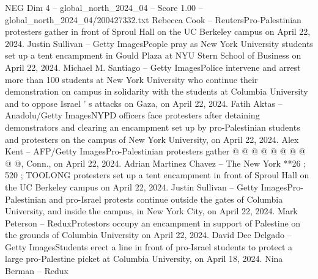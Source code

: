 \begin{textsample}{NEG Dim 4 – global\_north\_2024\_04 – Score 1.00 – global\_north\_2024\_04/200427332.txt}
Rebecca Cook -- ReutersPro-Palestinian protesters gather in front of Sproul Hall on the UC Berkeley campus on April 22, 2024.
Justin Sullivan -- Getty ImagesPeople pray as New York University students set up a tent encampment in Gould Plaza at NYU Stern School of Business on April 22, 2024.
Michael M.
Santiago -- Getty ImagesPolice intervene and arrest more than 100 students at New York University who continue their demonstration on campus in solidarity with the students at Columbia University and to oppose Israel ' s attacks on Gaza, on April 22, 2024.
Fatih Aktas -- Anadolu/Getty ImagesNYPD officers face protesters after detaining demonstrators and clearing an encampment set up by pro-Palestinian students and protesters on the campus of New York University, on April 22, 2024.
Alex Kent -- AFP/Getty ImagesPro-Palestinian protesters gather @ @ @ @ @ @ @ @ @ @, Conn., on April 22, 2024.
Adrian Martinez Chavez -- The New York **26 ; 520 ; TOOLONG protesters set up a tent encampment in front of Sproul Hall on the UC Berkeley campus on April 22, 2024.
Justin Sullivan -- Getty ImagesPro-Palestinian and pro-Israel protests continue outside the gates of Columbia University, and inside the campus, in New York City, on April 22, 2024.
Mark Peterson -- ReduxProtestors occupy an encampment in support of Palestine on the grounds of Columbia University on April 22, 2024.
David Dee Delgado -- Getty ImagesStudents erect a line in front of pro-Israel students to protect a large pro-Palestine picket at Columbia University, on April 18, 2024.
Nina Berman -- Redux

\end{textsample}
